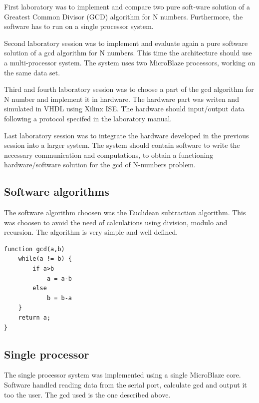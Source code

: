\documentclass[11pt]{article}
\begin{document}

First laboratory was to implement and compare two pure soft-ware solution of a Greatest Common Divisor (GCD) algorithm for N numbers. Furthermore, the software has to run on a single processor system.

Second laboratory session was to implement and evaluate again a pure software solution of a gcd algorithm for N numbers. This time the architecture should use a multi-processor system. The system uses two MicroBlaze processors, working on the same data set.

Third and fourth  laboratory session was to choose a part of the gcd algorithm for N number and implement it in hardware. The hardware part was writen and simulated in VHDL using Xilinx ISE.  The hardware should input/output data following a protocol specifed in the laboratory manual.

Last laboratory session was to integrate the hardware developed in the previous session into a larger system. The system should contain software to write the necessary communication and computations, to obtain a functioning hardware/software solution for the gcd of N-numbers problem.

\subsection{Software algorithms}
The software algorithm choosen was the Euclidean subtraction algorithm. This was choosen to avoid the need of calculations using division, modulo and recursion. The algorithm is very simple and well defined. 
\begin{lstlisting}[float=tbh,frame=tb,captionpos=b,caption={Euclidean subtracion algorithm},label=lst:example]
function gcd(a,b)
	while(a != b) {
		if a>b
			a = a-b
		else
			b = b-a
	}
	return a;
}
\end{lstlisting}

\subsection{Single processor}
The single processor system was implemented using a single MicroBlaze core. Software handled reading data from the serial port, calculate gcd and output it too the user. The gcd used is the one described above.
\end{document}
